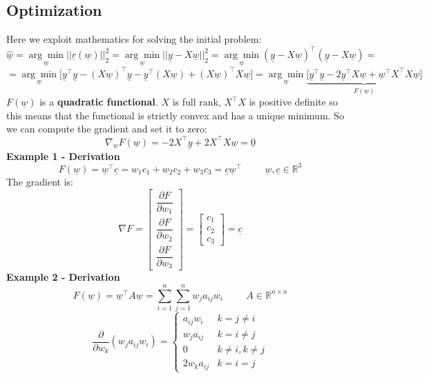 \subsection{Optimization}
Here we exploit mathematics for solving the initial problem:
\[
    \hat{\underline{w}} = \underset{\underline{w}}{\arg\min}||\underline{r}(\underline{w})||^2_2 = \underset{\underline{w}}{\arg\min}||\underline{y} - X\underline{w}||^2_2 = \underset{\underline{w}}{\arg\min}(\underline{y} - X\underline{w})^\intercal(\underline{y} - X\underline{w}) =     
\]
\[
    = \underset{\underline{w}}{\arg\min} \bigg[\underline{y}^\intercal \underline{y} - (X\underline{w})^\intercal \underline{y} - \underline{y}^\intercal (X\underline{w}) + (X\underline{w})^\intercal X\underline{w}  \bigg]= \underset{\underline{w}}{\arg\min} \underbrace{\bigg[\underline{y}^\intercal \underline{y} - 2\underline{y}^\intercal X\underline{w} + \underline{w}^\intercal X^\intercal X\underline{w}\bigg]}_{F(\underline{w})}
\]
$F(\underline{w})$ is a \textbf{quadratic functional}. $X$ is full rank, $X^\intercal X$ is positive definite so this means that the functional is strictly convex and has a unique minimum.
So we can compute the gradient and set it to zero:
\[
    \nabla_{\underline{w}}F(\underline{w}) = -2X^\intercal \underline{y} + 2X^\intercal X\underline{w} = \underline{0}
\]
\textbf{Example 1 - Derivation}
\[
    F(\underline{w}) = \underline{w}^\intercal \underline{c} = w_1 c_1 + w_2 c_2 + w_3 c_3 = \underline{c}\underline{w}^\intercal \hspace{1cm} \underline{w}, \underline{c} \in \mathbb{R}^3    
\]
The gradient is:
\[
    \nabla F = \begin{bmatrix}
        \dfrac{\partial F}{\partial w_1}\\
        \dfrac{\partial F}{\partial w_2}\\
        \dfrac{\partial F}{\partial w_3}
    \end{bmatrix} = \begin{bmatrix}
        c_1\\
        c_2\\
        c_3
    \end{bmatrix} = \underline{c}    
\]
\textbf{Example 2 - Derivation}
\[
    F(\underline{w}) = \underline{w}^\intercal A \underline{w} = \sum_{i=1}^n \sum_{j=1}^n w_j a_{ij} w_i \hspace{1cm} A \in \mathbb{R}^{n \times n}    
\]
\[
    \dfrac{\partial}{\partial w_k}(w_j a_{ij} w_i) = \begin{cases}
        a_{ij}w_i & k=j\neq i\\
        w_j a_{ij} & k=i\neq j\\
        0 & k\neq i , k\neq j\\
        2w_k a_{ij} & k=i=j
    \end{cases}    
\]

